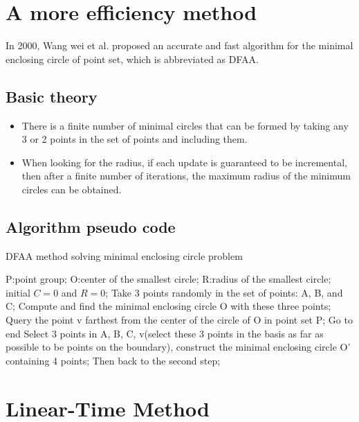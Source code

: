 \documentclass[a4paper, 12pt]{article}
\begin{document}
\newpage
\section{A more efficiency method}
%
In 2000, Wang wei et al. proposed an accurate and fast algorithm for the minimal enclosing circle of point set, which is abbreviated as DFAA.
\subsection{Basic theory}
%
\begin{itemize}
    \item{There is a finite number of minimal circles that can be formed by taking any 3 or 2 points in the set of points and including them.}
    \item{When looking for the radius, if each update is guaranteed to be incremental, then after a finite number of iterations, the maximum radius of the minimum circles can be obtained.}
\end{itemize}


\subsection{Algorithm pseudo code}
%
\begin{algorithm}[h]  
  \caption{DFAA method solving minimal enclosing circle problem}  
  \label{alg::DFAA method}  
  \begin{algorithmic}[1]  
    \Require  
      P:point group;  
    \Ensure  
      O:center of the smallest circle;
      R:radius of the smallest circle;
    \State initial $C=0$ and $R=0$;    
    \State Take 3 points randomly in the set of points: A, B, and C;  
    \State Compute and find the minimal enclosing circle O with these three points;
    \State Query the point v farthest from the center of the circle of O in point set P;
    \State Go to end  
    \Else
    \State Select 3 points in {A, B, C, v}(select these 3 points in the basis as far as possible to be points on the boundary), construct the minimal enclosing circle O' containing 4 points;
    \State Then back to the second step;
    \EndIf
  \end{algorithmic}  
\end{algorithm}  

\newpage
\section{Linear-Time Method}
%
\end{document}
